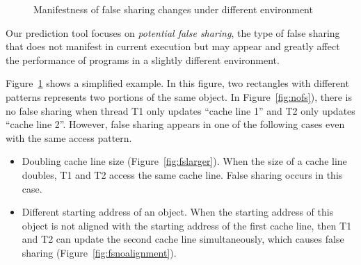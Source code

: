 \begin{figure}
\begin{center} 
%
\hspace{30pt}
%
\hspace{30pt}
%
\end{center}
\caption{Manifestness of false sharing changes under different environment}
\label{fig:potentialfalsesharing}
\end{figure}
Our prediction tool focuses on {\it potential false sharing}, the type of
false sharing that does not 
manifest in current execution but may appear and greatly affect the performance of programs
in a slightly different environment.

Figure~\ref{fig:potentialfalsesharing} shows a simplified example.
In this figure, two rectangles with different patterns
represents two portions of the same 
object. In Figure~\ref{fig:nofs}), there is no false sharing when thread T1 only updates 
``cache line 1'' and T2 only updates ``cache line 2''.
However, false sharing appears in one of the following cases even with the same
access pattern. 

\begin{itemize}
\item
Doubling cache line size (Figure~\ref{fig:fslarger}). When the size of a
cache line doubles,
T1 and T2 access the same cache line. False sharing occurs in this case.

\item
Different starting address of an object. 
When the starting address of this object is not aligned with the starting address of 
the first cache line, 
then T1 and T2 can update the second cache line simultaneously, 
which causes false sharing (Figure~\ref{fig:fsnoalignment}). 
\end{itemize} 

